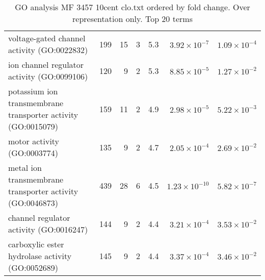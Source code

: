 \begin{table}[ht]
\begin{adjustbox}{width=\textwidth}
\begin{tabular}{lrrrrrr}
  voltage-gated channel activity (GO:0022832) & 199 & 15 & 3 & 5.3 & $3.92 \times 10^{-7}$ & $1.09 \times 10^{-4}$ \\ 
  ion channel regulator activity (GO:0099106) & 120 & 9 & 2 & 5.3 & $8.85 \times 10^{-5}$ & $1.27 \times 10^{-2}$ \\ 
  potassium ion transmembrane transporter activity (GO:0015079) & 159 & 11 & 2 & 4.9 & $2.98 \times 10^{-5}$ & $5.22 \times 10^{-3}$ \\ 
  motor activity (GO:0003774) & 135 & 9 & 2 & 4.7 & $2.05 \times 10^{-4}$ & $2.69 \times 10^{-2}$ \\ 
  metal ion transmembrane transporter activity (GO:0046873) & 439 & 28 & 6 & 4.5 & $1.23 \times 10^{-10}$ & $5.82 \times 10^{-7}$ \\ 
  channel regulator activity (GO:0016247) & 144 & 9 & 2 & 4.4 & $3.21 \times 10^{-4}$ & $3.53 \times 10^{-2}$ \\ 
  carboxylic ester hydrolase activity (GO:0052689) & 145 & 9 & 2 & 4.4 & $3.37 \times 10^{-4}$ & $3.46 \times 10^{-2}$ \\ 
   \hline
\end{tabular}
\end{adjustbox}
\caption{GO analysis MF 3457 10cent clo.txt ordered by fold change. Over representation only. Top 20 terms} 
\label{tab:GO analysis MF 3457 10cent clo.txt ordered by fold change. Over representation only. Top 20 terms}
\end{table}


